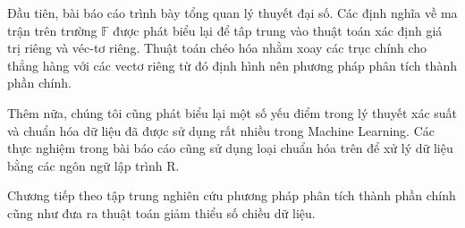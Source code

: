\documentclass[../thesis.tex]{subfiles}
\begin{document}
Đầu tiên, bài báo cáo trình bày tổng quan lý thuyết đại số. Các định nghĩa về ma trận trên trường $ \mathbb{F} $ được phát biểu lại để tâp trung vào thuật toán xác định giá trị riêng và véc-tơ riêng. Thuật toán chéo hóa nhằm xoay các trục chính cho thẳng hàng với các vectơ riêng từ đó định hình nên phương pháp phân tích thành phần chính.

Thêm nữa, chúng tôi cũng phát biểu lại một số yếu điểm trong lý thuyết xác suất và chuẩn hóa dữ liệu đã được sử dụng rất nhiều trong Machine Learning. Các thực nghiệm trong bài báo cáo cũng sử dụng loại chuẩn hóa trên để xử lý dữ liệu bằng các ngôn ngữ lập trình R.  

Chương tiếp theo tập trung nghiên cứu phương pháp phân tích thành phần chính cũng như đưa ra thuật toán giảm thiểu số chiều dữ liệu.
\end{document}
